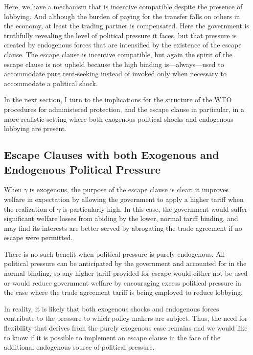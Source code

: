 \documentclass[12pt]{article}
\newcommand{\ga}{\gamma}
\begin{document}

Here, we have a mechanism that is incentive compatible despite the presence of lobbying. And although the burden of paying for the transfer falls on others in the economy, at least the trading partner is compensated. Here the government is truthfully revealing the level of political pressure it faces, but that pressure is created by endogenous forces that are intensified by the existence of the escape clause. The escape clause is incentive compatible, but again the spirit of the escape clause is not upheld because the high binding is---always---used to accommodate pure rent-seeking instead of invoked only when necessary to accommodate a political shock.

In the next section, I turn to the implications for the structure of the WTO procedures for administered protection, and the escape clause in particular, in a more realistic setting where both exogenous political shocks and endogenous lobbying are present.


\subsection{Escape Clauses with both Exogenous and Endogenous Political Pressure}
\label{sec:escape2}
When $\ga$ is exogenous, the purpose of the escape clause is clear: it improves welfare in expectation by allowing the government to apply a higher tariff when the realization of $\ga$ is particularly high. In this case, the government would suffer significant welfare losses from abiding by the lower, normal tariff binding, and may find its interests are better served by abrogating the trade agreement if no escape were permitted.

There is no such benefit when political pressure is purely endogenous. All political pressure can be anticipated by the government and accounted for in the normal binding, so any higher tariff provided for escape would either not be used or would reduce government welfare by encouraging excess political pressure in the case where the trade agreement tariff is being employed to reduce lobbying.

In reality, it is likely that both exogenous shocks and endogenous forces contribute to the pressure to which policy makers are subject. Thus, the need for flexibility that derives from the purely exogenous case remains and we would like to know if it is possible to implement an escape clause in the face of the additional endogenous source of political pressure.
\end{document}
